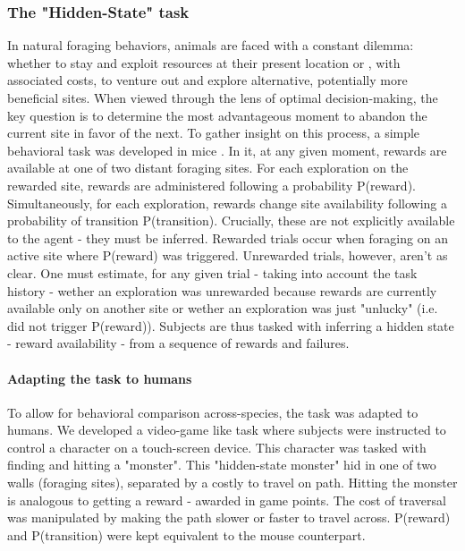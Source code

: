 \documentclass[11pt]{article}
\begin{document}
\subsubsection{The "Hidden-State" task}
In natural foraging behaviors, animals are faced with a constant dilemma: whether to stay and exploit resources at their present location or , with associated costs, to venture out and explore alternative, potentially more beneficial sites. When viewed through the lens of optimal decision-making, the key question is to determine the most advantageous moment to abandon the current site in favor of the next. To gather insight on this process, a simple behavioral task was developed in mice \cite{vertechi2020inference}. In it, at any given moment, rewards are available at one of two distant foraging sites. For each exploration on the rewarded site, rewards are administered following a probability P(reward). Simultaneously, for each exploration, rewards change site availability following a probability of transition P(transition). Crucially, these are not explicitly available to the agent - they  must be inferred. Rewarded trials occur when foraging on an active site where P(reward) was triggered. Unrewarded trials, however, aren't as clear. One must estimate, for any given trial - taking into account the task history - wether an exploration was unrewarded because rewards are currently available only on another site or wether an exploration was just "unlucky" (i.e. did not trigger P(reward)).
Subjects are thus tasked with inferring a hidden state - reward availability - from a sequence of rewards and failures.

\paragraph{Adapting the task to humans}
To allow for behavioral comparison across-species, the task was adapted to humans. We developed a video-game like task where subjects were instructed to control a character on a touch-screen device. This character was tasked with finding and hitting a "monster". This "hidden-state monster" hid in one of two walls (foraging sites), separated by a costly to travel on path. Hitting the monster is analogous to getting a reward - awarded in game points. The cost of traversal was manipulated by making the path slower or faster to travel across. P(reward) and P(transition) were kept equivalent to the mouse counterpart.
\end{document}
